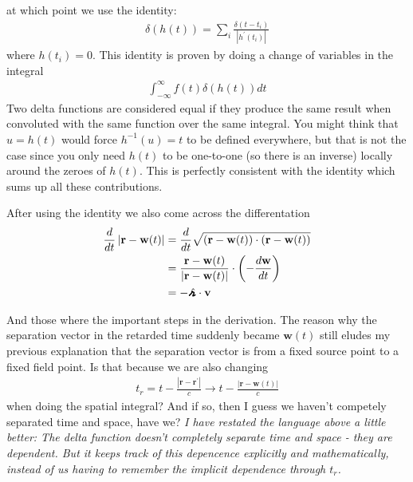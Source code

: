at which point we use the identity: \begin{align*}
    \delta (h(t)) = \sum_{i} \frac{\delta (t - t_i)}{\left| h^{\prime} (t_i) \right| } 
\end{align*}
where \(h(t_i) = 0\). This identity is proven by doing a change of variables in the integral \begin{align*}
    \int _{- \infty}^{\infty} f(t) \delta (h(t)) dt
\end{align*} 
Two delta functions are considered equal if they produce the same result when convoluted with the same function over the same integral. You might think that \(u = h(t)\) would force \(h^{-1}(u) = t\) to be defined everywhere, but that is not the case since you only need \(h(t)\) to be one-to-one (so there is an inverse) locally around the zeroes of \(h(t)\). This is perfectly consistent with the identity which sums up all these contributions.

After using the identity we also come across the differentation \begin{align*}
    \frac{d}{dt} \left| \mathbf{r} - \mathbf{w}(t)\right| &= \frac{d}{dt} \sqrt{(\mathbf{r} - \mathbf{w}(t)) \cdot (\mathbf{r} - \mathbf{w}(t))} \\
    &= \frac{\mathbf{r} - \mathbf{w}(t)}{\left| \mathbf{r} - \mathbf{w}(t) \right| } \cdot \left( - \frac{d \mathbf{w}}{dt} \right) \\
    &= - \hatgriffr \cdot  \mathbf{v}
\end{align*}

And those where the important steps in the derivation. The reason why the separation vector in the retarded time suddenly became \(\mathbf{w}(t)\) still eludes my previous explanation that the separation vector is from a fixed source point to a fixed field point. Is that because we are also changing \begin{align*}
    t_r = t - \frac{\left| \mathbf{r} - \mathbf{r}^{\prime}  \right| }{c} \to t - \frac{\left| \mathbf{r} - \mathbf{w}(t) \right| }{c}
\end{align*}
when doing the spatial integral? And if so, then I guess we haven't competely separated time and space, have we? \textit{I have restated the language above a little better: The delta function doesn't completely separate time and space - they \emph{are} dependent. But it keeps track of this depencence explicitly and mathematically, instead of us having to remember the implicit dependence through \(t_r\).}